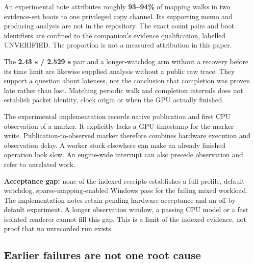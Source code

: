 \unverified An experimental note attributes roughly \textbf{93--94\%} of mapping walks in
two evidence-set boots to one privileged copy channel. Its supporting memo and producing
analysis are not in the repository. The exact count pairs and boot identifiers are confined
to the companion's evidence qualification, labelled UNVERIFIED. The proportion is not a
measured attribution in this paper.

\unverified The \textbf{2.43 s / 2.529 s} pair and a longer-watchdog arm without a recovery
before its time limit are likewise supplied analysis without a public raw trace. They support
a question about lateness, not the conclusion that completion was proven late rather than
lost. Matching periodic walk and completion intervals does not establish packet identity,
clock origin or when the GPU actually finished.

\doc The experimental implementation records native publication and first CPU observation of
a marker. It explicitly lacks a GPU timestamp for the marker write. Publication-to-observed
marker therefore combines hardware execution and observation delay. A worker stuck elsewhere
can make an already finished operation look slow. An engine-wide interrupt can also precede
observation and refer to unrelated work.

\textbf{Acceptance gap:} none of the indexed receipts establishes a full-profile,
default-watchdog, sparse-mapping-enabled Windows pass for the failing mixed workload.
The implementation notes retain pending hardware acceptance and an off-by-default experiment.
A longer observation window, a passing CPU model or a fast isolated renderer cannot fill this
gap. This is a limit of the indexed evidence, not proof that no unrecorded run exists.

\subsection{Earlier failures are not one root cause}

